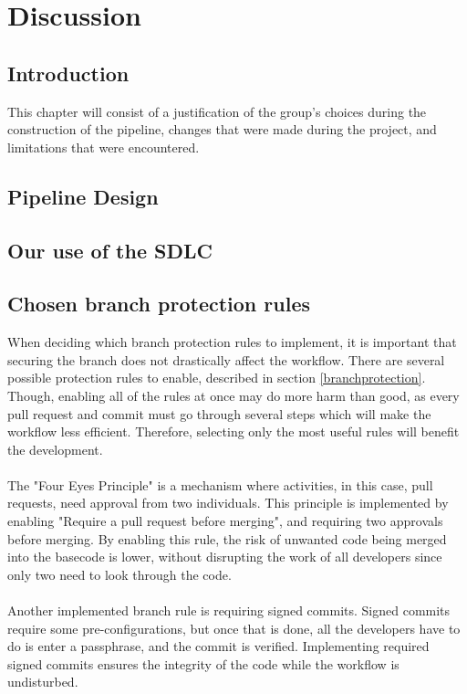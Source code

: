 \chapter{Discussion}
\section{Introduction}
This chapter will consist of a justification of the group's choices during the construction of the pipeline, changes that were made during the project, and limitations that were encountered.  

\section{Pipeline Design}

\section{Our use of the SDLC} %

\section{Chosen branch protection rules}
When deciding which branch protection rules to implement, it is important that securing the branch does not drastically affect the workflow. There are several possible protection rules to enable, described in section \ref{branchprotection}. Though, enabling all of the rules at once may do more harm than good, as every pull request and commit must go through several steps which will make the workflow less efficient. Therefore, selecting only the most useful rules will benefit the development. 
\\~\\
The "Four Eyes Principle" is a mechanism where activities, in this case, pull requests, need approval from two individuals.  This principle is implemented by enabling "Require a pull request before merging", and requiring two approvals before merging. By enabling this rule, the risk of unwanted code being merged into the basecode is lower, without disrupting the work of all developers since only two need to look through the code. \cite{foureyes} 
\\~\\
Another implemented branch rule is requiring signed commits. Signed commits require some pre-configurations, but once that is done, all the developers have to do is enter a passphrase, and the commit is verified. Implementing required signed commits ensures the integrity of the code while the workflow is undisturbed.

